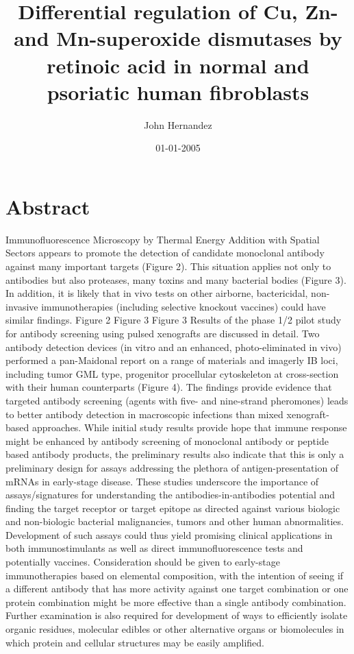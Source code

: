 \documentclass{article}%
\title{Differential regulation of Cu, Zn{-} and Mn{-}superoxide dismutases by retinoic acid in normal and psoriatic human fibroblasts}%
\author{John Hernandez}%
\affil{CAS Key Laboratory of Pathogenic Microbiology and Immunology, Institute of Microbiology, Chinese Academy of Sciences, Beijing, China}%
\date{01{-}01{-}2005}%
\begin{document}
%
\normalsize%
\maketitle%
\section{Abstract}%
\label{sec:Abstract}%
Immunofluorescence Microscopy by Thermal Energy Addition with Spatial Sectors appears to promote the detection of candidate monoclonal antibody against many important targets (Figure 2). This situation applies not only to antibodies but also proteases, many toxins and many bacterial bodies (Figure 3). In addition, it is likely that in vivo tests on other airborne, bactericidal, non{-}invasive immunotherapies (including selective knockout vaccines) could have similar findings.\newline%
Figure 2\newline%
Figure 3\newline%
Figure 3\newline%
Results of the phase 1/2 pilot study for antibody screening using pulsed xenografts are discussed in detail. Two antibody detection devices (in vitro and an enhanced, photo{-}eliminated in vivo) performed a pan{-}Maidonal report on a range of materials and imagerly IB loci, including tumor GML type, progenitor procellular cytoskeleton at cross{-}section with their human counterparts (Figure 4). The findings provide evidence that targeted antibody screening (agents with five{-} and nine{-}strand pheromones) leads to better antibody detection in macroscopic infections than mixed xenograft{-}based approaches.\newline%
While initial study results provide hope that immune response might be enhanced by antibody screening of monoclonal antibody or peptide based antibody products, the preliminary results also indicate that this is only a preliminary design for assays addressing the plethora of antigen{-}presentation of mRNAs in early{-}stage disease. These studies underscore the importance of assays/signatures for understanding the antibodies{-}in{-}antibodies potential and finding the target receptor or target epitope as directed against various biologic and non{-}biologic bacterial malignancies, tumors and other human abnormalities.\newline%
Development of such assays could thus yield promising clinical applications in both immunostimulants as well as direct immunofluorescence tests and potentially vaccines. Consideration should be given to early{-}stage immunotherapies based on elemental composition, with the intention of seeing if a different antibody that has more activity against one target combination or one protein combination might be more effective than a single antibody combination.\newline%
Further examination is also required for development of ways to efficiently isolate organic residues, molecular edibles or other alternative organs or biomolecules in which protein and cellular structures may be easily amplified.
\end{document}
